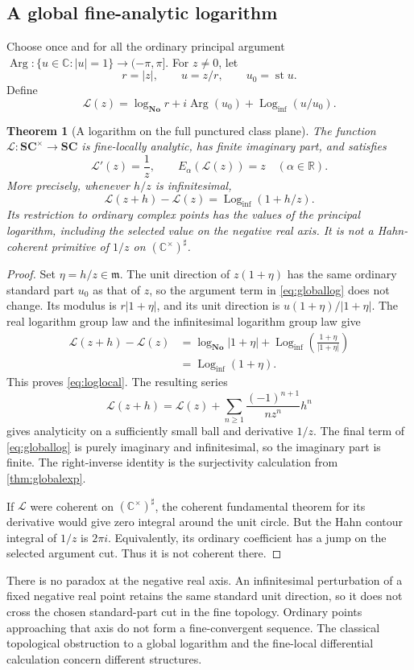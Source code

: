 \documentclass[11pt,letterpaper]{article}
\newtheorem{theorem}{Theorem}[section]
\theoremstyle{definition}
\theoremstyle{remark}
\newcommand{\No}{\mathbf{No}}
\newcommand{\SC}{\mathbf{SC}}
\newcommand{\R}{\mathbb R}
\newcommand{\C}{\mathbb C}
\newcommand{\mm}{\mathfrak m}
\newcommand{\st}{\operatorname{st}}
\newcommand{\Arg}{\operatorname{Arg}}
\newcommand{\Logi}{\operatorname{Log}_{\mathrm{inf}}}
\newcommand{\sh}{^{\sharp}}
\numberwithin{equation}{section}
\begin{document}
\subsection{A global fine-analytic logarithm}
Choose once and for all the ordinary principal argument $\Arg:\{u\in\C:|u|=1\}\to(-\pi,\pi]$. For $z\ne0$, let
\[
 r=|z|,\qquad u=z/r,\qquad u_0=\st u.
\]
Define
\begin{equation}\label{eq:globallog}
 \mathcal L(z)=\log_{\No}r+i\Arg(u_0)+\Logi(u/u_0).
\end{equation}

\begin{theorem}[A logarithm on the full punctured class plane]\label{thm:globallog}
The function $\mathcal L:\SC^\times\to\SC$ is fine-locally analytic, has finite imaginary part, and satisfies
\[
 \mathcal L'(z)=\frac1z,
 \qquad E_\alpha(\mathcal L(z))=z
 \quad(\alpha\in\R).
\]
More precisely, whenever $h/z$ is infinitesimal,
\begin{equation}\label{eq:loglocal}
 \mathcal L(z+h)-\mathcal L(z)=\Logi(1+h/z).
\end{equation}
Its restriction to ordinary complex points has the values of the principal logarithm, including the selected value on the negative real axis. It is not a Hahn-coherent primitive of $1/z$ on $(\C^\times)\sh$.
\end{theorem}
\begin{proof}
Set $\eta=h/z\in\mm$. The unit direction of $z(1+\eta)$ has the same ordinary standard part $u_0$ as that of $z$, so the argument term in \eqref{eq:globallog} does not change. Its modulus is $r|1+\eta|$, and its unit direction is $u(1+\eta)/|1+\eta|$. The real logarithm group law and the infinitesimal logarithm group law give
\begin{align*}
 \mathcal L(z+h)-\mathcal L(z)
 &=\log_{\No}|1+\eta|
   +\Logi\!\left(\frac{1+\eta}{|1+\eta|}\right)\\
 &=\Logi(1+\eta).
\end{align*}
This proves \eqref{eq:loglocal}. The resulting series
\[
 \mathcal L(z+h)=\mathcal L(z)+
 \sum_{n\ge1}\frac{(-1)^{n+1}}{n z^n}h^n
\]
gives analyticity on a sufficiently small ball and derivative $1/z$. The final term of \eqref{eq:globallog} is purely imaginary and infinitesimal, so the imaginary part is finite. The right-inverse identity is the surjectivity calculation from \cref{thm:globalexp}.

If $\mathcal L$ were coherent on $(\C^\times)\sh$, the coherent fundamental theorem for its derivative would give zero integral around the unit circle. But the Hahn contour integral of $1/z$ is $2\pi i$. Equivalently, its ordinary coefficient has a jump on the selected argument cut. Thus it is not coherent there.
\end{proof}
There is no paradox at the negative real axis. An infinitesimal perturbation of a fixed negative real point retains the same standard unit direction, so it does not cross the chosen standard-part cut in the fine topology. Ordinary points approaching that axis do not form a fine-convergent sequence. The classical topological obstruction to a global logarithm and the fine-local differential calculation concern different structures.
\end{document}
